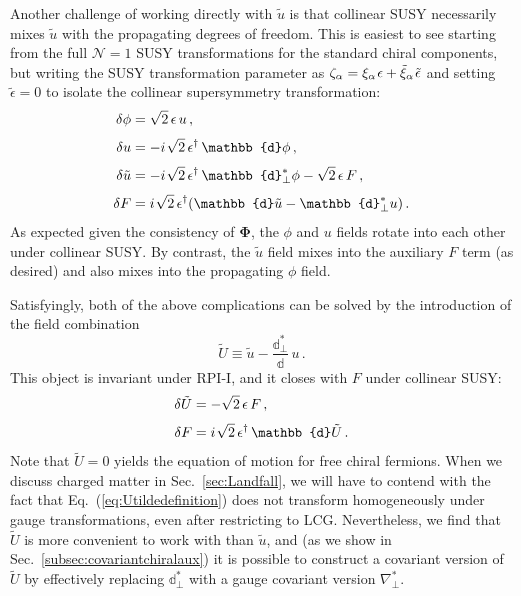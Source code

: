 \documentclass[12pt,document,nofootinbib,superscriptaddress,onecolumn,preprintnumbers,balancelastpage]{article}
\newcommand{\s}{\hspace{0.8pt}}
\newcommand{\PP}{\mathbb{d}}
\DeclareRobustCommand{\Sec}[1]{Sec.~\ref{#1}}
\DeclareRobustCommand{\Eq}[1]{Eq.~(\ref{#1})}
\newcommand{\bPhi}{ \boldsymbol \Phi}
\newcommand{\uu}{\tilde u}
\begin{document}
\begin{spacing}{1.2}
Another challenge of working directly with $\uu$ is that collinear SUSY necessarily mixes $\uu$ with the propagating degrees of freedom.
%
This is easiest to see starting from the full $\mathcal{N}= 1$ SUSY transformations for the standard chiral components, but writing the SUSY transformation parameter as $\zeta_\alpha = \xi_\alpha\s \epsilon + \tilde{\xi}_\alpha\s \tilde{\epsilon}$ and setting $\tilde{\epsilon} = 0$ to isolate the collinear supersymmetry transformation:
%
\begin{align}
\label{eq:collinearsusyauxcomp}
\delta \phi &= \sqrt{2}\, \epsilon\, u \,, \notag \\[3pt] 
\delta u &= - i\s \sqrt{2}\,  \epsilon^\dagger\, \PP \phi  \, ,\notag \\[3pt]
\delta \uu &= - i\s \sqrt{2}\,   \epsilon^\dagger\, \PP_\perp^* \phi - \sqrt{2}\, \epsilon\, F \, , \notag \\[3pt]
 \delta F &=   i \s\sqrt{2}\,  \epsilon^\dagger (\PP \uu - \PP_\perp^* u)   \, .
\end{align}
%
As expected given the consistency of $\bPhi$, the $\phi$ and $u$ fields rotate into each other under collinear SUSY.
%
By contrast, the $\uu$ field mixes into the auxiliary $F$ term (as desired) and also mixes into the propagating $\phi$ field.


Satisfyingly, both of the above complications can be solved by the introduction of the field combination
%
\begin{equation}
\label{eq:Utildedefinition}
\tilde{U} \equiv \uu - \frac{\PP_\perp^*}{\PP}\,u\,.
\end{equation}
%
This object is invariant under RPI-I, and it closes with $F$ under collinear SUSY: 
%
\begin{align}
\label{eq:collinearsusyauxcomp_restrict}
\delta \tilde{U} &= - \sqrt{2}\, \epsilon\, F \, , \notag \\[3pt] 
 \delta F &=   i\s \sqrt{2}\,  \epsilon^\dagger\,\PP \tilde{U} \, .
\end{align}
%
Note that $\tilde{U} = 0$ yields the equation of motion for free chiral fermions.
%
When we discuss charged matter in \Sec{sec:Landfall}, we will have to contend with the fact that \Eq{eq:Utildedefinition} does not transform homogeneously under gauge transformations, even after restricting to LCG.
%
Nevertheless, we find that $\tilde{U}$ is more convenient to work with than $\uu$, and (as we show in \Sec{subsec:covariantchiralaux}) it is possible to construct a covariant version of $\tilde{U}$ by effectively replacing $\PP_\perp^*$ with a gauge covariant version $\nabla_\perp^*$.





\end{spacing}
\end{document}
